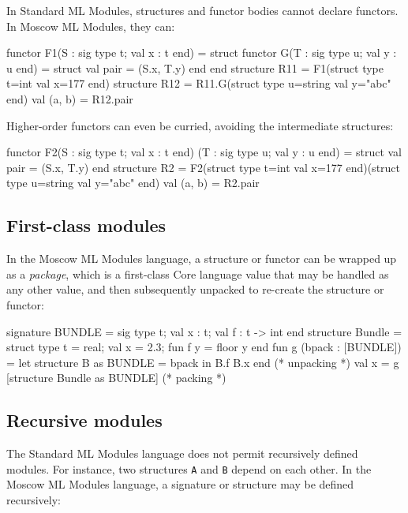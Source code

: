 \documentclass[fleqn,a4paper]{article}
\begin{document}
In Standard ML Modules, structures and functor bodies cannot declare
functors.  In Moscow ML Modules, they can:

\begin{program}
functor F1(S : sig type t; val x : t end) = struct
    functor G(T : sig type u; val y : u end) = struct val pair = (S.x, T.y) end
end
structure R11 = F1(struct type t=int val x=177 end)
structure R12 = R11.G(struct type u=string val y="abc" end)
val (a, b) = R12.pair
\end{program}

\noindent 
Higher-order functors can even be curried, avoiding the intermediate
structures:

\begin{program}
functor F2(S : sig type t; val x : t end) (T : sig type u; val y : u end) = 
   struct val pair = (S.x, T.y) end
structure R2 = 
   F2(struct type t=int val x=177 end)(struct type u=string val y="abc" end)
val (a, b) = R2.pair
\end{program}


\subsection{First-class modules}
\label{sec-firstclass-modules}

In the Moscow ML Modules language, a structure or functor can be
wrapped up as a \emph{package}, which is a first-class Core language
value that may be handled as any other value, and then subsequently
unpacked to re-create the structure or functor:

\begin{program}
signature BUNDLE = sig 
    type t;  val x : t;  val f : t -> int
end
structure Bundle = struct
   type t = real;  val x = 2.3;  fun f y = floor y
end
fun g (bpack : [BUNDLE]) =
    let structure B as BUNDLE = bpack in B.f B.x end    (* unpacking *)
val x = g [structure Bundle as BUNDLE]                  (* packing   *)
\end{program}


\subsection{Recursive modules}
\label{sec-rec-modules}

The Standard ML Modules language does not permit recursively defined
modules.  For instance, two structures \texttt{A} and \texttt{B}
depend on each other.  In the Moscow ML Modules language, a signature
or structure may be defined recursively:
\end{document}
